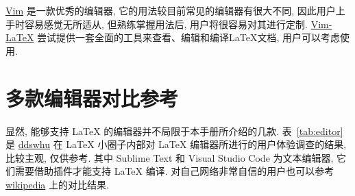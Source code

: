\href{https://www.vim.org/}{Vim} 是一款优秀的编辑器,
它的用法较目前常见的编辑器有很大不同,
因此用户上手时容易感觉无所适从,
但熟练掌握用法后,
用户将很容易对其进行定制.
\href{http://vim-latex.sourceforge.net/}{Vim-LaTeX}
尝试提供一套全面的工具来查看、编辑和编译LaTeX文档,
用户可以考虑使用.

\section{多款编辑器对比参考}

显然, 能够支持 \LaTeX{} 的编辑器并不局限于本手册所介绍的几款.
表~\ref{tab:editor} 是 \href{https://ddswhu.me/}{ddswhu} 在 \LaTeX{}
小圈子内部对 \LaTeX{} 编辑器所进行的用户体验调查的结果, 比较主观, 仅供参考.
其中 Sublime Text 和 Visual Studio Code 为文本编辑器,
它们需要借助插件才能支持 \LaTeX{} 编译.
对自己网络非常自信的用户也可以参考
\href{https://en.wikipedia.org/wiki/Comparison_of_TeX_editors}{wikipedia}
上的对比结果.

